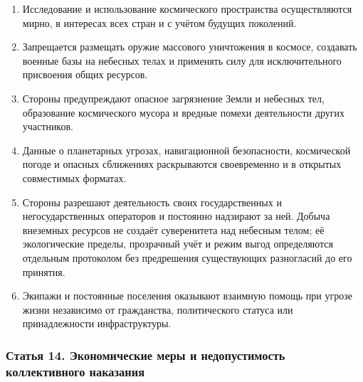 \documentclass[
  russian,
  11pt,
  a4paper,
]{article}
\providecommand{\tightlist}{%
  \setlength{\itemsep}{0pt}\setlength{\parskip}{0pt}}
\begin{document}
\begin{enumerate}
\def\labelenumi{\arabic{enumi}.}
\tightlist
\item
  Исследование и использование космического пространства осуществляются
  мирно, в интересах всех стран и с учётом будущих поколений.
\item
  Запрещается размещать оружие массового уничтожения в космосе,
  создавать военные базы на небесных телах и применять силу для
  исключительного присвоения общих ресурсов.
\item
  Стороны предупреждают опасное загрязнение Земли и небесных тел,
  образование космического мусора и вредные помехи деятельности других
  участников.
\item
  Данные о планетарных угрозах, навигационной безопасности, космической
  погоде и опасных сближениях раскрываются своевременно и в открытых
  совместимых форматах.
\item
  Стороны разрешают деятельность своих государственных и
  негосударственных операторов и постоянно надзирают за ней. Добыча
  внеземных ресурсов не создаёт суверенитета над небесным телом; её
  экологические пределы, прозрачный учёт и режим выгод определяются
  отдельным протоколом без предрешения существующих разногласий до его
  принятия.
\item
  Экипажи и постоянные поселения оказывают взаимную помощь при угрозе
  жизни независимо от гражданства, политического статуса или
  принадлежности инфраструктуры.
\end{enumerate}

\subsubsection{Статья 14. Экономические меры и недопустимость
коллективного
наказания}\label{ux441ux442ux430ux442ux44cux44f-14-ux44dux43aux43eux43dux43eux43cux438ux447ux435ux441ux43aux438ux435-ux43cux435ux440ux44b-ux438-ux43dux435ux434ux43eux43fux443ux441ux442ux438ux43cux43eux441ux442ux44c-ux43aux43eux43bux43bux435ux43aux442ux438ux432ux43dux43eux433ux43e-ux43dux430ux43aux430ux437ux430ux43dux438ux44f}
\end{document}
